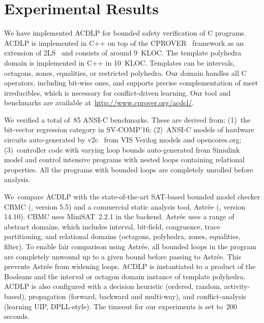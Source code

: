 \section{Experimental Results}
%
We have implemented ACDLP for bounded safety verification of C programs.  
ACDLP is implemented in C++ on top of the
\textsc{CPROVER}~\cite{cprover} framework as an extension of 2LS~\cite{2ls}
and consists of around 9~KLOC. 
The template polyhedra domain is implemented in C++ in 10~KLOC.  Templates
can be intervals, octagons, zones, equalities, or restricted polyhedra.  Our
domain handles all C operators, including bit-wise ones, and supports
precise complementation of meet irreducibles, which is necessary for
conflict-driven learning.  Our tool and benchmarks are available 
at~\url{http://www.cprover.org/acdcl/}.
%


We verified a total of~85 ANSI-C benchmarks.  These are derived from:
(1)~the bit-vector regression category in SV-COMP'16; (2)~ANSI-C models of
hardware circuits auto-generated by v2c~\cite{mtk2016} from VIS Verilog
models and opencores.org; (3)~controller code with varying loop bounds 
auto-generated from Simulink model and control 
intensive programs with nested loops containing relational properties. 
All the programs with bounded loops are completely unrolled before
analysis.  


We~compare ACDLP with the state-of-the-art SAT-based bounded model checker
CBMC (\cite{cbmc}, version 5.5) and a commercial static analysis tool,
Astr{\'e}e (\cite{astree}, version 14.10).  CBMC uses MiniSAT~2.2.1 in the
backend.  Astr{\'e}e uses a range of abstract domains, which includes
interval, bit-field, congruence, trace partitioning, and relational domains
(octagons, polyhedra, zones, equalities, filter).  To enable fair comparison
using Astr{\'e}e, all bounded loops in the program are completely unwound up
to a given bound before passing to Astr{\'e}e.  This prevents Astr{\'e}e
from widening loops.
%
ACDLP is instantiated to a product of the Booleans and the interval or
octagon domain instance of template polyhedra.  ACDLP is also
configured with a decision heuristic (ordered, random,
activity-based), propagation (forward, backward and multi-way), and
conflict-analysis (learning UIP, DPLL-style).  The timeout for our
experiments is set to~200 seconds.
%

